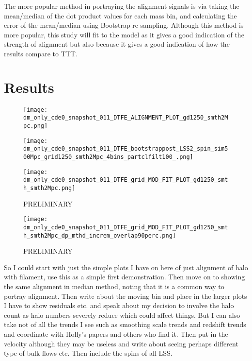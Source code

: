 \documentclass[a4paper,fleqn,usenatbib]{mnras}
\begin{document}
The more popular method in portraying the alignment signals is via taking the mean/median of the dot product values for each mass bin, and calculating the error of the mean/median using Bootstrap re-sampling. Although this method is more popular, this study will fit to the model as it gives a good indication of the strength of alignment but also because it gives a good indication of how the results compare to TTT.

\section{Results}\label{results}
 
\begin{figure}
\centering
\texttt{[image: dm\_only\_cde0\_snapshot\_011\_DTFE\_ALIGNMENT\_PLOT\_gd1250\_smth2Mpc.png]}
\label{cor_fig} 
\end{figure}
\begin{figure}
\centering
\texttt{[image: dm\_only\_cde0\_snapshot\_011\_DTFE\_bootstrappost\_LSS2\_spin\_sim500Mpc\_grid1250\_smth2Mpc\_4bins\_partclfilt100\_.png]}\label{cor_fig_cde0} 
\end{figure}
\begin{figure}
\centering
\texttt{[image: dm\_only\_cde0\_snapshot\_011\_DTFE\_grid\_MOD\_FIT\_PLOT\_gd1250\_smth\_smth2Mpc.png]}\label{cor_fig_wdm2} 
\caption{PRELIMINARY}
\end{figure}
\begin{figure}
\centering
\texttt{[image: dm\_only\_cde0\_snapshot\_011\_DTFE\_grid\_MOD\_FIT\_PLOT\_gd1250\_smth\_smth2Mpc\_dp\_mthd\_increm\_overlap90perc.png]}\label{cor_fig_wdm2} 
\caption{PRELIMINARY}
\end{figure}
So I could start with just the simple plots I have on here of just alignment of halo with filament, use this as a simple first demonstration. Then move on to showing the same alignment in median method, noting that it is a common way to portray alignment. Then write about the moving bin and place in the larger plots I have to show residuals etc. and speak about my decision to involve the halo count as halo numbers severely reduce which could affect things. But I can also take not of all the trends I see such as smoothing scale trends and redshift trends and coordinate with Holly's papers and others who find it. Then put in the velocity although they may be useless and write about seeing perhaps different type of bulk flows etc. Then include the spins of all LSS.
\\
\end{document}
